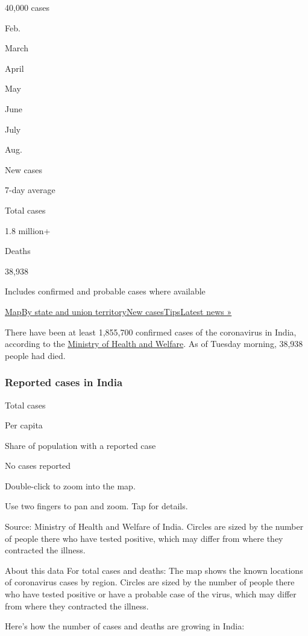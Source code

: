 40,000 cases

Feb.

March

April

May

June

July

Aug.

New cases

7-day average

Total cases

1.8 million+

Deaths

38,938

Includes confirmed and probable cases where available

\protect\hyperlink{map}{Map}\protect\hyperlink{states}{By state and
union territory}\protect\hyperlink{cases}{New
cases}\protect\hyperlink{tips}{Tips}\href{https://www.nytimes3xbfgragh.onion/2020/08/03/world/coronavirus-covid-19.html}{Latest
news »}

There have been at least 1,855,700 confirmed cases of the coronavirus in
India, according to the \href{https://www.mohfw.gov.in/}{Ministry of
Health and Welfare}. As of Tuesday morning, 38,938 people had died.

\hypertarget{reported-cases-in-india}{%
\subsubsection{Reported cases in India}\label{reported-cases-in-india}}

Total cases

Per capita

Share of population with a reported case

No cases reported

Double-click to zoom into the map.

Use two fingers to pan and zoom. Tap for details.

Source: Ministry of Health and Welfare of India. Circles are sized by
the number of people there who have tested positive, which may differ
from where they contracted the illness.

About this data For total cases and deaths: The map shows the known
locations of coronavirus cases by region. Circles are sized by the
number of people there who have tested positive or have a probable case
of the virus, which may differ from where they contracted the illness.

Here's how the number of cases and deaths are growing in India:

